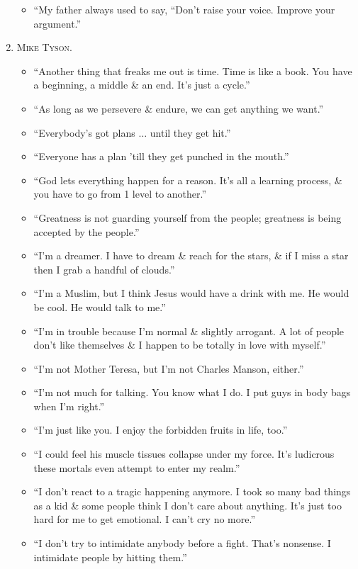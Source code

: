 \documentclass{article}
\numberwithin{equation}{section}
\begin{document}
\begin{enumerate}
	\begin{itemize}
		\item ``My father always used to say, ``Don't raise your voice. Improve your argument.''
	\end{itemize}
	\item \textsc{Mike Tyson.}
	\begin{itemize}
		\item ``Another thing that freaks me out is time. Time is like a book. You have a beginning, a middle \& an end. It's just a cycle.''
		\item ``As long as we persevere \& endure, we can get anything we want.''
		\item ``Everybody's got plans $\ldots$ until they get hit.''
		\item ``Everyone has a plan 'till they get punched in the mouth.''
		\item ``God lets everything happen for a reason. It's all a learning process, \& you have to go from 1 level to another.''
		\item ``Greatness is not guarding yourself from the people; greatness is being accepted by the people.''
		\item ``I'm a dreamer. I have to dream \& reach for the stars, \& if I miss a star then I grab a handful of clouds.''
		\item ``I'm a Muslim, but I think Jesus would have a drink with me. He would be cool. He would talk to me.''
		\item ``I'm in trouble because I'm normal \& slightly arrogant. A lot of people don't like themselves \& I happen to be totally in love with myself.''
		\item ``I'm not Mother Teresa, but I'm not Charles Manson, either.''
		\item ``I'm not much for talking. You know what I do. I put guys in body bags when I'm right.''
		\item ``I'm just like you. I enjoy the forbidden fruits in life, too.''
		\item ``I could feel his muscle tissues collapse under my force. It's ludicrous these mortals even attempt to enter my realm.''
		\item ``I don't react to a tragic happening anymore. I took so many bad things as a kid \& some people think I don't care about anything. It's just too hard for me to get emotional. I can't cry no more.''
		\item ``I don't try to intimidate anybody before a fight. That's nonsense. I intimidate people by hitting them.''

\end{itemize}
\end{enumerate}
\end{document}
